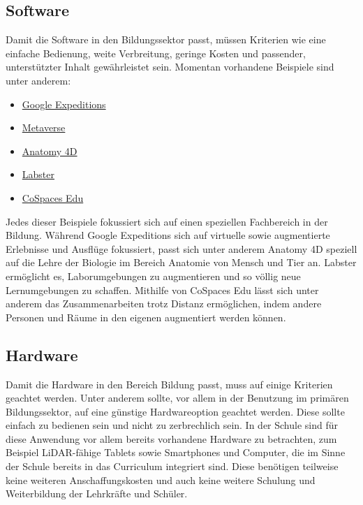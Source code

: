 \documentclass[conference]{IEEEtran}
\begin{document}
\subsection{Software}
Damit die Software in den Bildungssektor passt, müssen Kriterien wie eine einfache Bedienung,
weite Verbreitung, geringe Kosten und passender, unterstützter Inhalt gewährleistet sein. Momentan
vorhandene Beispiele sind unter anderem:
\begin{itemize}
    \item \href{https://sites.google.com/dublinschools.net/vr-ar/google-geo-tools/google-expeditions}{Google Expeditions}
    \item \href{https://koerber-stiftung.de/projekte/eustory/teaching-and-learning-in-the-metaverse/}{Metaverse}
    \item \href{https://www.4danatomy.com/}{Anatomy 4D}
    \item \href{https://www.labster.com/}{Labster}
    \item \href{https://www.cospaces.io/}{CoSpaces Edu}
\end{itemize}
Jedes dieser Beispiele fokussiert sich auf einen speziellen Fachbereich
in der Bildung. Während Google Expeditions sich auf virtuelle sowie augmentierte
Erlebnisse und Ausflüge fokussiert, passt sich unter anderem Anatomy 4D speziell
auf die Lehre der Biologie im Bereich Anatomie von Mensch und Tier an. 
Labster ermöglicht es, Laborumgebungen zu augmentieren und so 
völlig neue Lernumgebungen zu schaffen. Mithilfe von CoSpaces Edu lässt sich unter 
anderem das Zusammenarbeiten trotz Distanz ermöglichen, indem andere Personen und 
Räume in den eigenen augmentiert werden können. \cite{w1}

\subsection{Hardware}
Damit die Hardware in den Bereich Bildung passt, muss auf einige Kriterien geachtet werden.
Unter anderem sollte, vor allem in der Benutzung im primären Bildungssektor, auf eine günstige Hardwareoption geachtet werden. Diese sollte einfach zu bedienen sein und nicht zu zerbrechlich sein.
In der Schule sind für diese Anwendung vor allem bereits vorhandene Hardware zu betrachten, zum Beispiel
LiDAR-fähige Tablets sowie Smartphones und Computer, die im Sinne der Schule bereits in das Curriculum
integriert sind. Diese benötigen teilweise keine weiteren Anschaffungskosten und auch keine weitere Schulung und Weiterbildung der Lehrkräfte und Schüler. 
\end{document}
